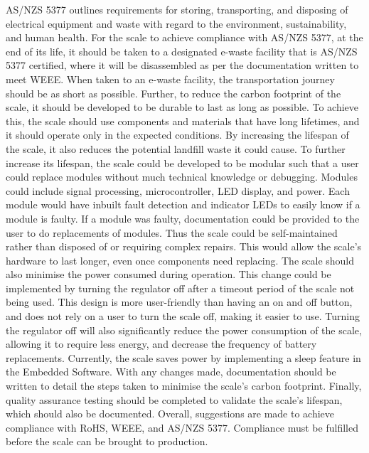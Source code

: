 AS/NZS 5377 outlines requirements for storing, transporting, and disposing of electrical equipment and waste with regard to the environment, sustainability, and human health. For the scale to achieve compliance with AS/NZS 5377, at the end of its life, it should be taken to a designated e-waste facility that is AS/NZS 5377 certified, where it will be disassembled as per the documentation written to meet WEEE. When taken to an e-waste facility, the transportation journey should be as short as possible. Further, to reduce the carbon footprint of the scale, it should be developed to be durable to last as long as possible. To achieve this, the scale should use components and materials that have long lifetimes, and it should operate only in the expected conditions. By increasing the lifespan of the scale, it also reduces the potential landfill waste it could cause. To further increase its lifespan, the scale could be developed to be modular such that a user could replace modules without much technical knowledge or debugging. Modules could include signal processing, microcontroller, LED display, and power. Each module would have inbuilt fault detection and indicator LEDs to easily know if a module is faulty. If a module was faulty, documentation could be provided to the user to do replacements of modules. Thus the scale could be self-maintained rather than disposed of or requiring complex repairs. This would allow the scale’s hardware to last longer, even once components need replacing. The scale should also minimise the power consumed during operation. This change could be implemented by turning the regulator off after a timeout period of the scale not being used. This design is more user-friendly than having an on and off button, and does not rely on a user to turn the scale off, making it easier to use. Turning the regulator off will also significantly reduce the power consumption of the scale, allowing it to require less energy, and decrease the frequency of battery replacements. Currently, the scale saves power by implementing a sleep feature in the Embedded Software. With any changes made, documentation should be written to detail the steps taken to minimise the scale’s carbon footprint. Finally, quality assurance testing should be completed to validate the scale’s lifespan, which should also be documented.
Overall, suggestions are made to achieve compliance with RoHS, WEEE, and AS/NZS 5377. Compliance must be fulfilled before the scale can be brought to production.
